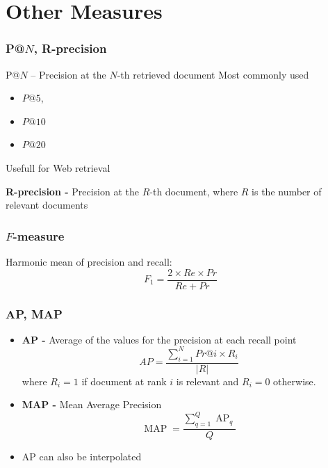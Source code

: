 \documentclass[svgnames]{beamer}
\begin{document}
\section{Other Measures}

\begin{frame}
  \frametitle{P@$N$, R-precision }
  
  \begin{block}{P@$N$ -- Precision at the $N$-th retrieved document}
    Most commonly used 
  \begin{itemize}
    \item $P@5$, 
    \item $P@10$ 
    \item $P@20$
  \end{itemize}
  Usefull for Web retrieval
  \end{block}

  \begin{block}{}
\textbf{R-precision -} Precision at the $R$-th document, where $R$ is
      the number of relevant documents
  \end{block}

\end{frame}

\begin{frame}
  \frametitle{$F$-measure }
  \begin{block}{Harmonic mean of precision and recall:}
      \begin{displaymath}
        F_1 = \frac{2 \times Re \times Pr}{Re + Pr}
    \end{displaymath}
  \end{block}
\end{frame}





\begin{frame}
  \frametitle{AP, MAP}
  
  \begin{block}{}
    \begin{itemize}
    \item \textbf{AP -} Average of the values for the precision at each recall
        point
        \begin{displaymath}
            AP = \frac{\sum_{i=1}^N Pr@i \times R_i}{|R|}
        \end{displaymath}
        where $R_i = 1$ if document at rank $i$ is relevant and $R_i = 0$
        otherwise.
    \item \textbf{MAP -} Mean Average Precision
        \begin{displaymath}
            \operatorname{MAP} = \frac{\sum_{q=1}^Q\operatorname{AP}_q}{Q}
        \end{displaymath}
    \item AP can also be interpolated
    \end{itemize}
  \end{block}
\end{frame}
\end{document}
